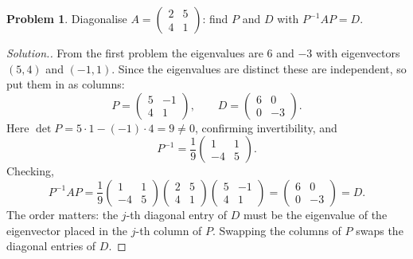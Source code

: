 \documentclass[11pt,a4paper]{article}
\theoremstyle{definition}
\newtheorem{problemx}{Problem}[section]
\newenvironment{problem}{\begin{problemx}}{\end{problemx}}
\newenvironment{solution}
  {\renewcommand{\qedsymbol}{}\begin{proof}[\textit{Solution}.]}
  {\end{proof}}
\begin{document}
\begin{problem}
Diagonalise $A=\begin{pmatrix}2&5\\4&1\end{pmatrix}$: find $P$ and $D$ with
$P^{-1}AP=D$.
\end{problem}
\begin{solution}
From the first problem the eigenvalues are $6$ and $-3$ with eigenvectors
$(5,4)$ and $(-1,1)$. Since the eigenvalues are distinct these are independent,
so put them in as columns:
$$P=\begin{pmatrix}5&-1\\4&1\end{pmatrix},\qquad
  D=\begin{pmatrix}6&0\\0&-3\end{pmatrix}.$$
Here $\det P=5\cdot 1-(-1)\cdot 4=9\neq 0$, confirming invertibility, and
$$P^{-1}=\frac{1}{9}\begin{pmatrix}1&1\\-4&5\end{pmatrix}.$$
Checking,
$$P^{-1}AP=\frac{1}{9}\begin{pmatrix}1&1\\-4&5\end{pmatrix}
\begin{pmatrix}2&5\\4&1\end{pmatrix}
\begin{pmatrix}5&-1\\4&1\end{pmatrix}
=\begin{pmatrix}6&0\\0&-3\end{pmatrix}=D.$$
The order matters: the $j$-th diagonal entry of $D$ must be the eigenvalue of
the eigenvector placed in the $j$-th column of $P$. Swapping the columns of $P$
swaps the diagonal entries of $D$.
\end{solution}
\end{document}
